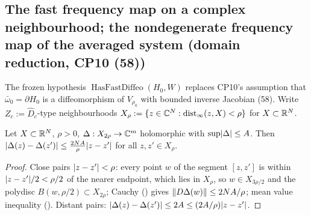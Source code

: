 \subsection{The fast frequency map on a complex neighbourhood; the nondegenerate frequency map of the averaged system (domain reduction, CP10 (58))}\label{bpP:p5:domain-reduction}

The frozen hypothesis $\operatorname{HasFastDiffeo}(H_0,W)$ replaces CP10's assumption that $\bar\omega_0=\partial H_0$ is a diffeomorphism of $V_{\rho_0}$ with bounded inverse Jacobian (58). Write $Z_c:=\hat D_c$-type neighbourhoods $X_\rho:=\{z\in\mathbb{C}^N:\operatorname{dist}_\infty(z,X)<\rho\}$ for $X\subset\mathbb{R}^N$.

\begin{lemma}\label{bpP:p5:lip-complex}
Let $X\subset\mathbb{R}^N$, $\rho>0$, $\Delta:X_{2\rho}\to\mathbb{C}^m$ holomorphic with $\sup\lvert \Delta\rvert\le A$. Then $\lvert \Delta(z)-\Delta(z')\rvert\le\frac{2NA}{\rho}\lvert z-z'\rvert$ for all $z,z'\in X_\rho$.
\end{lemma}
\begin{proof}
Close pairs $\lvert z-z'\rvert<\rho$: every point $w$ of the segment $[z,z']$ is within $\lvert z-z'\rvert/2<\rho/2$ of the nearer endpoint, which lies in $X_\rho$, so $w\in X_{3\rho/2}$ and the polydisc $B(w,\rho/2)\subset X_{2\rho}$; Cauchy () gives $\lVert D\Delta(w)\rVert\le2NA/\rho$; mean value inequality (). Distant pairs: $\lvert \Delta(z)-\Delta(z')\rvert\le2A\le(2A/\rho)\lvert z-z'\rvert$.
\end{proof}

